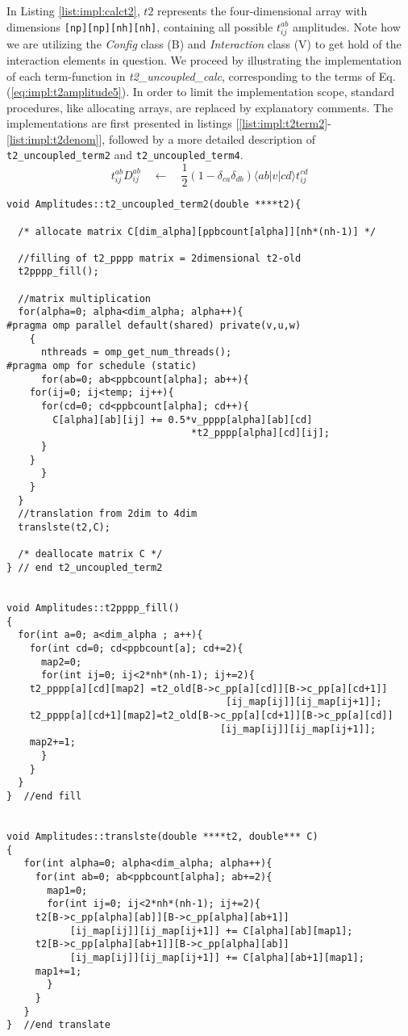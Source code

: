 %
In Listing \ref{list:impl:calct2}, $t2$ represents the four-dimensional array with dimensions \texttt{[np][np][nh][nh]}, containing all possible $t_{ij}^{ab}$ amplitudes. Note how we are utilizing the \emph{Config} class (B) and \emph{Interaction} class (V) to get hold of the interaction elements in question. We proceed by illustrating the implementation of each term-function in \emph{t2\_uncoupled\_calc}, corresponding to the terms of Eq. (\ref{eq:impl:t2amplitude5}). In order to limit the implementation scope, standard procedures, like allocating arrays, are replaced by explanatory comments. The implementations are first presented in listings [\ref{list:impl:t2term2}-\ref{list:impl:t2denom}], followed by a more detailed description of \texttt{t2\_uncoupled\_term2} and \texttt{t2\_uncoupled\_term4}.
%
\begin{equation}
t_{ij}^{ab}D_{ij}^{ab}\quad \leftarrow \quad \frac{1}{2}(1-\delta_{ca}\delta_{db})\langle ab|v|cd\rangle t_{ij}^{cd}\nonumber
\end{equation}
%
\begin{lstlisting}[label={list:impl:t2term2},caption={implementation of the amp1 class function t2\_uncoupled\_term2()}]
void Amplitudes::t2_uncoupled_term2(double ****t2){

  /* allocate matrix C[dim_alpha][ppbcount[alpha]][nh*(nh-1)] */
  
  //filling of t2_pppp matrix = 2dimensional t2-old
  t2pppp_fill();
  
  //matrix multiplication
  for(alpha=0; alpha<dim_alpha; alpha++){
#pragma omp parallel default(shared) private(v,u,w) 
    {      
      nthreads = omp_get_num_threads();
#pragma omp for schedule (static)
      for(ab=0; ab<ppbcount[alpha]; ab++){
	for(ij=0; ij<temp; ij++){
	  for(cd=0; cd<ppbcount[alpha]; cd++){
	    C[alpha][ab][ij] += 0.5*v_pppp[alpha][ab][cd]
                                *t2_pppp[alpha][cd][ij];
	  }
	}
      } 
    }
  }
  //translation from 2dim to 4dim
  translste(t2,C);
  
  /* deallocate matrix C */
} // end t2_uncoupled_term2


void Amplitudes::t2pppp_fill()
{
  for(int a=0; a<dim_alpha ; a++){
    for(int cd=0; cd<ppbcount[a]; cd+=2){
      map2=0;
      for(int ij=0; ij<2*nh*(nh-1); ij+=2){
	t2_pppp[a][cd][map2] =t2_old[B->c_pp[a][cd]][B->c_pp[a][cd+1]]
                                      [ij_map[ij]][ij_map[ij+1]];
	t2_pppp[a][cd+1][map2]=t2_old[B->c_pp[a][cd+1]][B->c_pp[a][cd]]
                                     [ij_map[ij]][ij_map[ij+1]];
	map2+=1;
      }
    }
  }
}  //end fill


void Amplitudes::translste(double ****t2, double*** C)
{
   for(int alpha=0; alpha<dim_alpha; alpha++){
     for(int ab=0; ab<ppbcount[alpha]; ab+=2){
       map1=0;
       for(int ij=0; ij<2*nh*(nh-1); ij+=2){
	 t2[B->c_pp[alpha][ab]][B->c_pp[alpha][ab+1]]
           [ij_map[ij]][ij_map[ij+1]] += C[alpha][ab][map1];
	 t2[B->c_pp[alpha][ab+1]][B->c_pp[alpha][ab]]
           [ij_map[ij]][ij_map[ij+1]] += C[alpha][ab+1][map1];
	 map1+=1;
       }
     }
   }
}  //end translate
\end{lstlisting}
